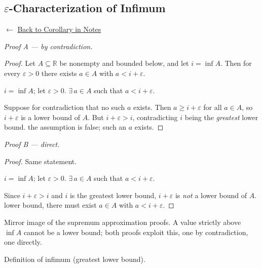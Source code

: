 
\subsection*{$\varepsilon$-Characterization of Infimum}
\label{prf:infimum-approximation}

\begin{remark*}[Return]
$\leftarrow$ \hyperref[cor:eps-approx]{Back to Corollary in Notes}
\end{remark*}

\noindent\textit{Proof A — by contradiction.}

\begin{proof}
\Claim Let $A \subseteq \mathbb{R}$ be nonempty and bounded below, and let
$i = \inf A$.
Then for every $\varepsilon > 0$ there exists $a \in A$ with $a < i + \varepsilon$.

\Given $i = \inf A$; let $\varepsilon > 0$.
\Goal $\exists\, a \in A$ such that $a < i + \varepsilon$.

\Strategy Suppose for contradiction that no such $a$ exists.
Then $a \ge i + \varepsilon$ for all $a \in A$, so $i + \varepsilon$ is a lower
bound of $A$.
But $i + \varepsilon > i$, contradicting $i$ being the \emph{greatest} lower bound.
\Therefore the assumption is false; such an $a$ exists. \AsReq
\end{proof}

\medskip
\noindent\textit{Proof B — direct.}

\begin{proof}
\Claim Same statement.

\Given $i = \inf A$; let $\varepsilon > 0$.
\Goal $\exists\, a \in A$ such that $a < i + \varepsilon$.

Since $i + \varepsilon > i$ and $i$ is the greatest lower bound, $i + \varepsilon$
is \emph{not} a lower bound of $A$.
\ByDef lower bound, there must exist $a \in A$ with $a < i + \varepsilon$. \AsReq
\end{proof}

\begin{remark*}
Mirror image of the supremum approximation proofs.
A value strictly above $\inf A$ cannot be a lower bound; both proofs exploit
this, one by contradiction, one directly.
\end{remark*}

\begin{remark*}[Dependencies]
Definition of infimum (greatest lower bound).
\end{remark*}
